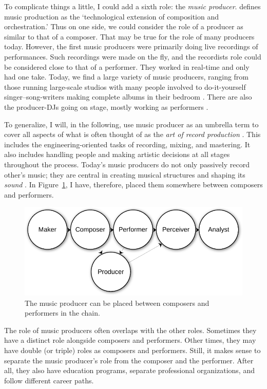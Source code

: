 To complicate things a little, I could add a sixth role: the \emph{music producer}. \citet[p. 5]{burgess_art_2013} defines music production as the `technological extension of composition and orchestration.' Thus on one side, we could consider the role of a producer as similar to that of a composer. That may be true for the role of many producers today. However, the first music producers were primarily doing live recordings of performances. Such recordings were made on the fly, and the recordists role could be considered close to that of a performer. They worked in real-time and only had one take. Today, we find a large variety of music producers, ranging from those running large-scale studios with many people involved to do-it-yourself singer--song-writers making complete albums in their bedroom \citep{jones_diy_2020}. There are also the producer-DJs going on stage, mostly working as performers \citep{kjus_live_2016}.

To generalize, I will, in the following, use music producer as an umbrella term to cover all aspects of what is often thought of as the \emph{art of record production} \citep{frith_art_2012}. This includes the engineering-oriented tasks of recording, mixing, and mastering. It also includes handling people and making artistic decisions at all stages throughout the process.
Today's music producers do not only passively record other's music; they are central in creating musical structures and shaping its \emph{sound} \citep{brovig-hanssen_digital_2016}. In Figure~\ref{fig:music-quadrant2}, I have, therefore, placed them somewhere between composers and performers.

\begin{figure}[tp]
\includegraphics[width=\columnwidth]{figures/04-producer-crop.pdf}
\caption{The music producer can be placed between composers and performers in the chain.}
\label{fig:music-quadrant2}
\end{figure}

The role of music producers often overlaps with the other roles. Sometimes they have a distinct role alongside composers and performers. Other times, they may have double (or triple) roles as composers and performers. Still, it makes sense to separate the music producer's role from the composer and the performer. After all, they also have education programs, separate professional organizations, and follow different career paths.


